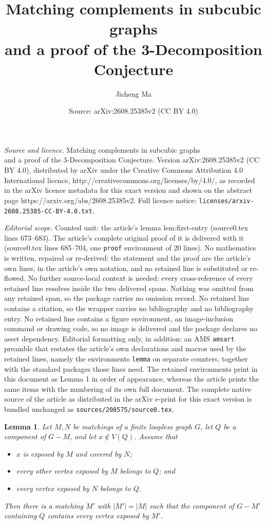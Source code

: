 \documentclass[10pt,a4paper]{amsart}
\title{Matching complements in subcubic graphs\\[2pt] and a proof of the 3-Decomposition Conjecture}
\author{Jicheng Ma}
\date{Source: arXiv:2608.25385v2 (CC BY 4.0)}
\newtheorem{lemma}{Lemma}
\newcommand{\abs}[1]{\left\lvert#1\right\rvert}
\begin{document}
\maketitle

\noindent\emph{Source and licence.} Matching complements in subcubic graphs\\[2pt] and a proof of the 3-Decomposition Conjecture. Version arXiv:2608.25385v2 (CC BY 4.0), distributed by arXiv under the Creative Commons Attribution 4.0 International licence, http://creativecommons.org/licenses/by/4.0/, as recorded in the arXiv licence metadata for this exact version and shown on the abstract page https://arxiv.org/abs/2608.25385v2. Full licence notice: \texttt{licenses/arxiv-2608.25385-CC-BY-4.0.txt}.\par\smallskip

\noindent\textit{Editorial scope.} Counted unit: the article's lemma lem:first-entry (source0.tex lines 673--683). The article's complete original proof of it is delivered with it (source0.tex lines 685--704, one \texttt{proof} environment of 20 lines). No mathematics is written, repaired or re-derived: the statement and the proof are the article's own lines, in the article's own notation, and no retained line is substituted or re-flowed.  No further source-local context is needed: every cross-reference of every retained line resolves inside the two delivered spans.  Nothing was omitted from any retained span, so the package carries no omission record.  No retained line contains a citation, so the wrapper carries no bibliography and no bibliography entry.  No retained line contains a figure environment, an image-inclusion command or drawing code, so no image is delivered and the package declares no asset dependency.  Editorial formatting only, in addition: an AMS \texttt{amsart} preamble that restates the article's own declarations and macros used by the retained lines, namely the environments \texttt{lemma} on separate counters, together with the standard packages those lines need.  The retained environments print in this document as Lemma 1 in order of appearance, whereas the article prints the same items with the numbering of its own full document.  The complete native source of the article as distributed in the arXiv e-print for this exact version is bundled unchanged as \texttt{sources/208575/source0.tex}.
\begin{lemma}\label{lem:first-entry}
  Let $M,N$ be matchings of a finite loopless graph $G$, let $Q$ be a component
  of $G-M$, and let $x\notin V(Q)$. Assume that
  \begin{itemize}
    \item $x$ is exposed by $M$ and covered by $N$;
    \item every other vertex exposed by $M$ belongs to $Q$; and
    \item every vertex exposed by $N$ belongs to $Q$.
  \end{itemize}
  Then there is a matching $M'$ with $\abs{M'}=\abs{M}$ such that the component
  of $G-M'$ containing $Q$ contains every vertex exposed by $M'$.
\end{lemma}
\end{document}

